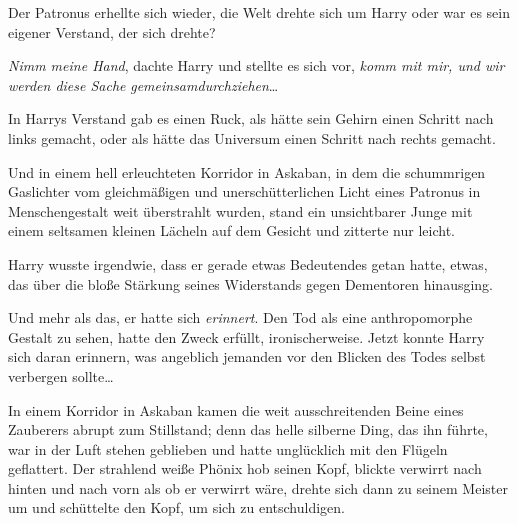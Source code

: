 Der Patronus erhellte sich wieder, die Welt drehte sich um Harry oder war es sein eigener Verstand, der sich drehte?

\emph{Nimm meine Hand}, dachte Harry und stellte es sich vor, \emph{komm mit mir, und wir werden diese Sache} \emph{gemeinsamdurchziehen}…

In Harrys Verstand gab es einen Ruck, als hätte sein Gehirn einen Schritt nach links gemacht, oder als hätte das Universum einen Schritt nach rechts gemacht.

Und in einem hell erleuchteten Korridor in Askaban, in dem die schummrigen Gaslichter vom gleichmäßigen und unerschütterlichen Licht eines Patronus in Menschengestalt weit überstrahlt wurden, stand ein unsichtbarer Junge mit einem seltsamen kleinen Lächeln auf dem Gesicht und zitterte nur leicht.

Harry wusste irgendwie, dass er gerade etwas Bedeutendes getan hatte, etwas, das über die bloße Stärkung seines Widerstands gegen Dementoren hinausging.

Und mehr als das, er hatte sich \emph{erinnert}. Den Tod als eine anthropomorphe Gestalt zu sehen, hatte den Zweck erfüllt, ironischerweise. Jetzt konnte Harry sich daran erinnern, was angeblich jemanden vor den Blicken des Todes selbst verbergen sollte…

\later

In einem Korridor in Askaban kamen die weit ausschreitenden Beine eines Zauberers abrupt zum Stillstand; denn das helle silberne Ding, das ihn führte, war in der Luft stehen geblieben und hatte unglücklich mit den Flügeln geflattert. Der strahlend weiße Phönix hob seinen Kopf, blickte verwirrt nach hinten und nach vorn als ob er verwirrt wäre, drehte sich dann zu seinem Meister um und schüttelte den Kopf, um sich zu entschuldigen.

